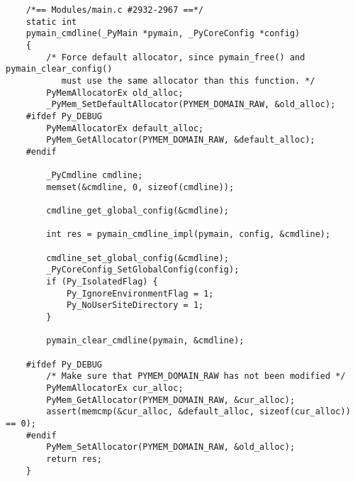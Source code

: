 \documentclass[UTF8]{book}
\begin{document}
\begin{lstlisting}
    /*== Modules/main.c #2932-2967 ==*/
    static int
    pymain_cmdline(_PyMain *pymain, _PyCoreConfig *config)
    {
        /* Force default allocator, since pymain_free() and pymain_clear_config()
           must use the same allocator than this function. */
        PyMemAllocatorEx old_alloc;
        _PyMem_SetDefaultAllocator(PYMEM_DOMAIN_RAW, &old_alloc);
    #ifdef Py_DEBUG
        PyMemAllocatorEx default_alloc;
        PyMem_GetAllocator(PYMEM_DOMAIN_RAW, &default_alloc);
    #endif

        _PyCmdline cmdline;
        memset(&cmdline, 0, sizeof(cmdline));

        cmdline_get_global_config(&cmdline);

        int res = pymain_cmdline_impl(pymain, config, &cmdline);

        cmdline_set_global_config(&cmdline);
        _PyCoreConfig_SetGlobalConfig(config);
        if (Py_IsolatedFlag) {
            Py_IgnoreEnvironmentFlag = 1;
            Py_NoUserSiteDirectory = 1;
        }

        pymain_clear_cmdline(pymain, &cmdline);

    #ifdef Py_DEBUG
        /* Make sure that PYMEM_DOMAIN_RAW has not been modified */
        PyMemAllocatorEx cur_alloc;
        PyMem_GetAllocator(PYMEM_DOMAIN_RAW, &cur_alloc);
        assert(memcmp(&cur_alloc, &default_alloc, sizeof(cur_alloc)) == 0);
    #endif
        PyMem_SetAllocator(PYMEM_DOMAIN_RAW, &old_alloc);
        return res;
    }
\end{lstlisting}


\end{document}
